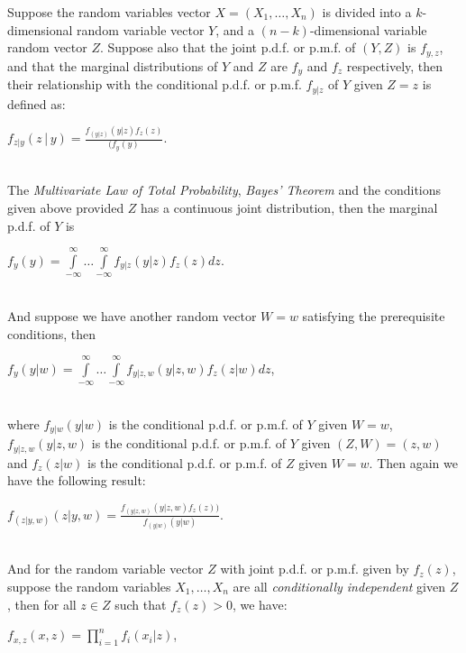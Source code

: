 \documentclass[12pt,twoside]{reedthesis}
\begin{document}
\begin{enumerate}
\begin{enumerate}
Suppose the random variables vector $X = (X_1, \dotsc, X_n)$ is divided into a $k$-dimensional random variable vector $Y$, and a $(n - k)$-dimensional variable random vector $Z$. Suppose also that the joint p.d.f. or p.m.f. of $(Y, Z)$ is $f_{y,z}$, and that the marginal distributions of $Y$ and $Z$ are $f_y$ and $f_z$ respectively, then their relationship with the conditional p.d.f. or p.m.f. $f_{y|z}$ of $Y$ given $Z = z$ is defined as:
\begin{center}
$f_{z|y} (z│y) = \frac{f_{(y|z)}(y|z) f_{z}(z)}{(f_{y}(y)}$.
\end{center}\\

The \textit{Multivariate Law of Total Probability}, \textit{Bayes’ Theorem} and the conditions given above provided $Z$ has a continuous joint distribution, then the marginal p.d.f. of $Y$ is
\begin{center}
$f_y(y) = \int\limits_{-\infty}^{\infty} \dotsc	\int\limits_{-\infty}^{\infty} f_{y|z}(y|z) f_z(z) dz$.
\end{center}\\

And suppose we have another random vector $W = w$ satisfying the prerequisite conditions, then 
\begin{center}
$f_y(y|w) = \int\limits_{-\infty}^{\infty} \dotsc \int\limits_{-\infty}^{\infty}  f_{y|z,w} (y|z, w) f_z(z|w) dz$,
\end{center}\\

where $f_{y|w}(y|w)$ is the conditional p.d.f. or p.m.f. of $Y$ given $W = w$, $f_{y|z,w}(y|z, w)$ is the conditional p.d.f. or p.m.f. of $Y$ given $(Z, W) = (z, w)$ and $f_z(z|w)$ is the conditional p.d.f. or p.m.f. of $Z$ given $W = w$. Then again we have the following result:
\begin{center}
$f_{(z|y,w)}(z|y, w) = \frac{f_{(y|z,w)}(y|z,w) f_z (z))}{f_{(y|w )}(y|w)}$.
\end{center}\\

And for the random variable vector $Z$ with joint p.d.f. or p.m.f. given by $f_z(z)$, suppose the random variables $X_1, \dotsc, X_n$ are all \textit{conditionally independent} given $Z$, then for all $z \in Z$ such that $f_z(z) > 0$, we have:
\begin{center} 
$f_{x,z}(x, z) = \prod\limits_{i=1}^n f_i (x_i|z)$,
\end{center}\\


\end{enumerate}
\end{enumerate}
\end{document}
